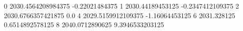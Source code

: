 0 2030.4564208984375 -0.22021484375
1 2030.44189453125 -0.2347412109375
2 2030.6766357421875 0.0
4 2029.5159912109375 -1.16064453125
6 2031.328125 0.6514892578125
8 2040.0712890625 9.3946533203125
